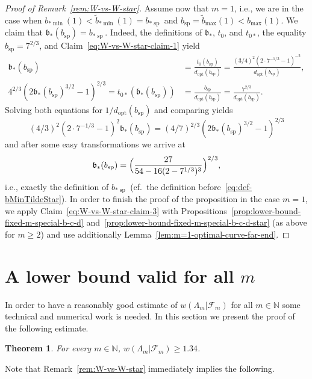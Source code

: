 \documentclass[a4paper]{amsart} %
\newtheorem{theorem}{Theorem}[section]
\theoremstyle{definition}
\theoremstyle{remark}
\numberwithin{equation}{section}
\newcommand*{\NN}{\mathbb{N}}
\newcommand*{\weakconstrestricted}[2]{w(#1|#2)} %
\newcommand*{\fclassspec}[1]{\mathcal{F}_{#1}}
\newcommand*{\tZeroStar}{t_{0*}}
\newcommand*{\bMax}{b_{\max}}
\newcommand*{\dOpt}{d_{\mathrm{opt}}}
\newcommand*{\bMinStar}{b_{*\!\min}}
\newcommand*{\bSh}{b_{\operatorname{sp}}}
\newcommand*{\bShStar}{b_{*\!\operatorname{sp}}}
\newcommand*{\bMaxTilde}{\widetilde{b}_{\max}}
\newcommand*{\bMinTildeStar}{\widetilde{b}_{*\!\min}}
\newcommand*{\bStarWvsWStar}{\mathfrak{b}_*}
\begin{document}
\begin{proof}[Proof of Remark~\ref{rem:W-vs-W-star}]
	Assume now that $m=1$, i.e., we are in the case when 
	$\bMinStar(1) < \bMinTildeStar(1) = \bShStar{}$
	and 
	$\bSh{} = \bMaxTilde(1)   < \bMax(1)$.
	We claim that $\bStarWvsWStar(\bSh) = \bShStar$.
	Indeed, the definitions of $\bStarWvsWStar$, $t_0$, and $\tZeroStar$,
	the equality $\bSh = 7^{2/3}$, and Claim~\eqref{eq:W-vs-W-star-claim-1} yield
	\begin{align*}
	\bStarWvsWStar(\bSh)
	&= \frac{t_0(\bSh)}{\dOpt(\bSh)} = 
	\frac{(3/4)^2 (2\cdot 7^{-1/3} - 1)^{-2}}{\dOpt(\bSh)},\\
	4^{2/3}(2\bStarWvsWStar(\bSh)^{3/2} -1 )^{2/3}
	=\tZeroStar(\bStarWvsWStar(\bSh))
	&=\frac{\bSh}{\dOpt(\bSh)} = \frac{7^{2/3}}{\dOpt(\bSh)}.
	\end{align*}
	Solving both equations for $1/\dOpt(\bSh)$ and comparing yields
	\[
	(4/3)^2 (2\cdot 7^{-1/3} - 1)^{2}\bStarWvsWStar(\bSh)
	= (4/7)^{2/3}(2\bStarWvsWStar(\bSh)^{3/2} -1 )^{2/3}
	\]
	and after some easy transformations  we arrive at
	\[
	\bStarWvsWStar(\bSh) = \Bigl(\frac{27}{54 - 16(2-7^{1/3})^3}\Bigr)^{2/3},
	\]
	i.e., exactly the definition of $\bShStar$ (cf.\ the definition before~\eqref{eq:def-bMinTildeStar}).
	In order to finish the proof of the proposition in the case $m=1$,
	we apply Claim~\eqref{eq:W-vs-W-star-claim-3} with Propositions~\ref{prop:lower-bound-fixed-m-special-b-c-d} 
	and~\ref{prop:lower-bound-fixed-m-special-b-c-d-star} 
	(as above for $m\geq 2$)
	and use additionally Lemma~\ref{lem:m=1-optimal-curve-far-end}. 
\end{proof}



\section{A lower bound valid for all \texorpdfstring{$m$}{m}}

\label{APP:crunching}

In order to have a reasonably good estimate of $\weakconstrestricted{\Lambda_m}{\fclassspec{m}}$ for all $m\in\NN$ some technical 
 and numerical work is needed.
In this section we present the proof of the following estimate.

\begin{theorem}
	\label{thm:main-lower-bounds-1.34}
	For every $m\in\NN$, $\weakconstrestricted{\Lambda_m}{\fclassspec{m}} \geq 1.34$.
\end{theorem}

Note that Remark~\ref{rem:W-vs-W-star} immediately implies the following.
\end{document}
